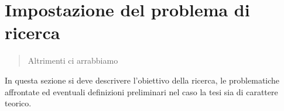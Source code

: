 \chapter{Impostazione del problema di ricerca}
\label{capitolo2}
\thispagestyle{empty}

\begin{quotation}
{\footnotesize
{}
\begin{flushright}
Altrimenti ci arrabbiamo
\end{flushright}
}
\end{quotation}
\vspace{0.5cm}

\noindent In questa sezione si deve descrivere l'obiettivo della ricerca, le problematiche affrontate ed eventuali definizioni preliminari nel caso la tesi sia di carattere teorico.